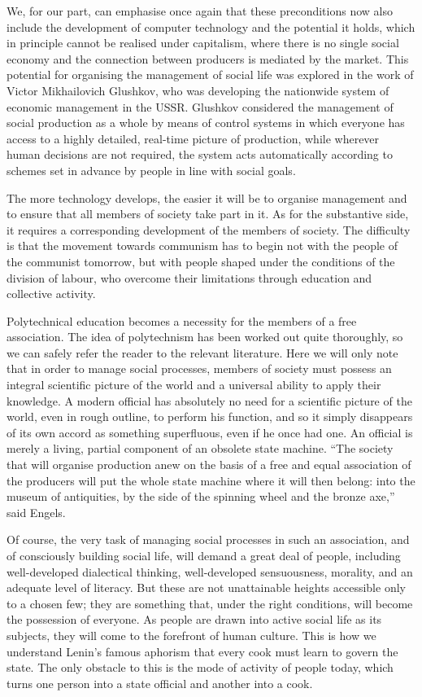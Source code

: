 \documentclass[../main]{subfiles}
\begin{document}
We, for our part, can emphasise once again that these preconditions now also include the development of computer technology and the potential it holds, which in principle cannot be realised under capitalism, where there is no single social economy and the connection between producers is mediated by the market. This potential for organising the management of social life was explored in the work of Victor Mikhailovich Glushkov, who was developing the nationwide system of economic management in the USSR. Glushkov considered the management of social production as a whole by means of control systems in which everyone has access to a highly detailed, real-time picture of production, while wherever human decisions are not required, the system acts automatically according to schemes set in advance by people in line with social goals.

The more technology develops, the easier it will be to organise management and to ensure that all members of society take part in it. As for the substantive side, it requires a corresponding development of the members of society. The difficulty is that the movement towards communism has to begin not with the people of the communist tomorrow, but with people shaped under the conditions of the division of labour, who overcome their limitations through education and collective activity.

Polytechnical education becomes a necessity for the members of a free association. The idea of polytechnism has been worked out quite thoroughly, so we can safely refer the reader to the relevant literature. Here we will only note that in order to manage social processes, members of society must possess an integral scientific picture of the world and a universal ability to apply their knowledge. A modern official has absolutely no need for a scientific picture of the world, even in rough outline, to perform his function, and so it simply disappears of its own accord as something superfluous, even if he once had one. An official is merely a living, partial component of an obsolete state machine. “The society that will organise production anew on the basis of a free and equal association of the producers will put the whole state machine where it will then belong: into the museum of antiquities, by the side of the spinning wheel and the bronze axe,” said Engels.

Of course, the very task of managing social processes in such an association, and of consciously building social life, will demand a great deal of people, including well-developed dialectical thinking, well-developed sensuousness, morality, and an adequate level of literacy. But these are not unattainable heights accessible only to a chosen few; they are something that, under the right conditions, will become the possession of everyone. As people are drawn into active social life as its subjects, they will come to the forefront of human culture. This is how we understand Lenin’s famous aphorism that every cook must learn to govern the state. The only obstacle to this is the mode of activity of people today, which turns one person into a state official and another into a cook.
\end{document}

